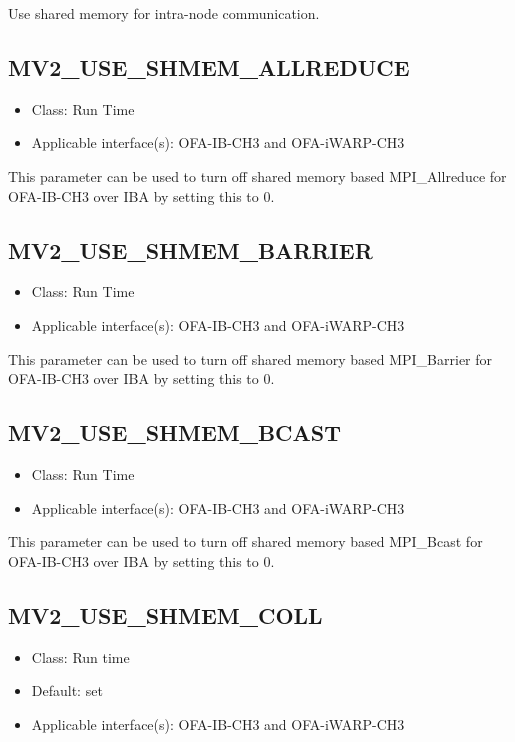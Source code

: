 Use shared memory for intra-node communication.

\subsection{MV2\_USE\_SHMEM\_ALLREDUCE}
\label{def:mv2-use-shmem-allreduce}
\begin{itemize}
		\item Class: Run Time
    \item Applicable interface(s): OFA-IB-CH3 and OFA-iWARP-CH3
\end{itemize}
This parameter can be used to turn off shared memory based
MPI\_Allreduce for OFA-IB-CH3 over IBA by setting this to 0.


\subsection{MV2\_USE\_SHMEM\_BARRIER}
\label{def:mv2-use-shmem-barrier}
\begin{itemize}
		\item Class: Run Time
    \item Applicable interface(s): OFA-IB-CH3 and OFA-iWARP-CH3
\end{itemize}
This parameter can be used to turn off shared memory based
MPI\_Barrier for OFA-IB-CH3 over IBA by setting this to 0.

\subsection{MV2\_USE\_SHMEM\_BCAST}
\label{def:mv2-use-shmem-bcast}
\begin{itemize}
                \item Class: Run Time
    \item Applicable interface(s): OFA-IB-CH3 and OFA-iWARP-CH3
\end{itemize}
This parameter can be used to turn off shared memory based
MPI\_Bcast for OFA-IB-CH3 over IBA by setting this to 0.

\subsection{MV2\_USE\_SHMEM\_COLL}
\label{def:mv2-use-shmem-coll}
\begin{itemize}
    \item Class: Run time
    \item Default: set 
    \item Applicable interface(s): OFA-IB-CH3 and OFA-iWARP-CH3
\end{itemize}

